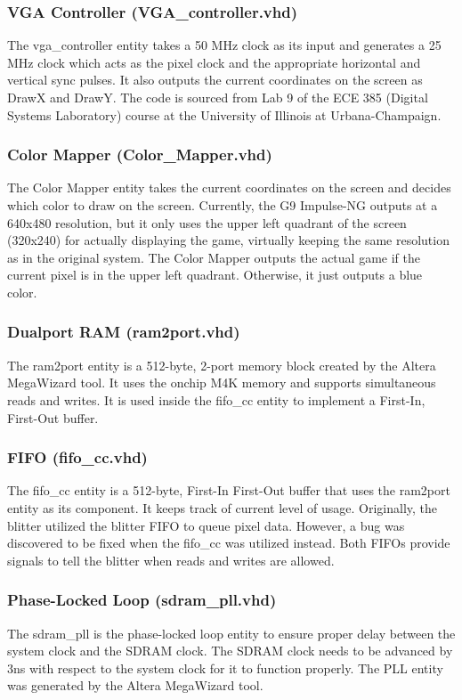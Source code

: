 \documentclass{report}
\begin{document}
\subsubsection{VGA Controller (VGA\_controller.vhd)}
The vga\_controller entity takes a 50 MHz clock as its input and 
generates a 25 MHz clock which acts as the pixel clock and the 
appropriate horizontal and vertical sync pulses. It also outputs the 
current coordinates on the screen as DrawX and DrawY. The code is 
sourced from Lab 9 of the ECE 385 (Digital Systems Laboratory) course at 
the University of Illinois at Urbana-Champaign.

\subsubsection{Color Mapper (Color\_Mapper.vhd)}
The Color Mapper entity takes the current coordinates on the screen and 
decides which color to draw on the screen. Currently, the G9 Impulse-NG 
outputs at a 640x480 resolution, but it only uses the upper left
quadrant of the screen (320x240) for actually displaying the game,
virtually keeping the same resolution as in the original system. The 
Color Mapper outputs the actual game if the current pixel is in the 
upper left quadrant. Otherwise, it just outputs a blue color.

\subsubsection{Dualport RAM (ram2port.vhd)}
The ram2port entity is a 512-byte, 2-port memory block created by the 
Altera MegaWizard tool. It uses the onchip M4K memory and supports 
simultaneous reads and writes. It is used inside the fifo\_cc entity to 
implement a First-In, First-Out buffer.

\subsubsection{FIFO (fifo\_cc.vhd)}
The fifo\_cc entity is a 512-byte, First-In First-Out buffer that uses 
the ram2port entity as its component. It keeps track of current level of 
usage. Originally, the blitter utilized the blitter FIFO to queue pixel 
data. However, a bug was discovered to be fixed when the fifo\_cc was 
utilized instead. Both FIFOs provide signals to tell the blitter when 
reads and writes are allowed.

\subsubsection{Phase-Locked Loop (sdram\_pll.vhd)}
The sdram\_pll is the phase-locked loop entity to ensure proper delay 
between the system clock and the SDRAM clock. The SDRAM clock needs to 
be advanced by 3ns with respect to the system clock for it to function 
properly. The PLL entity was generated by the Altera MegaWizard tool.
\end{document}
